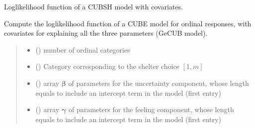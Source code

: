 \documentclass[letterpaper,10pt,english]{sphinxmanual}
\begin{document}
\begin{fulllineitems}
\label{\detokenize{cubmods:cubmods.cubsh_ywx.loglik}}
\pysigstartsignatures
{}
\pysigstopsignatures
\sphinxAtStartPar
Log\sphinxhyphen{}likelihood function of a CUBSH model with covariates.

\sphinxAtStartPar
Compute the log\sphinxhyphen{}likelihood function of a CUBE model for ordinal responses,
with covariates for explaining all the three parameters (GeCUB model).
\begin{quote}\begin{description}
\begin{itemize}
\item {} 
\sphinxAtStartPar
{} () \textendash{} number of ordinal categories

\item {} 
\sphinxAtStartPar
{} () \textendash{} Category corresponding to the shelter choice \([1,m]\)

\item {} 
\sphinxAtStartPar
{} () \textendash{} array \(\pmb \beta\) of parameters for the uncertainty component, whose length equals 
 to include an intercept term in the model (first entry)

\item {} 
\sphinxAtStartPar
{} () \textendash{} array \(\pmb \gamma\) of parameters for the feeling component, whose length equals 
 to include an intercept term in the model (first entry)


\end{itemize}
\end{description}
\end{quote}
\end{fulllineitems}
\end{document}
